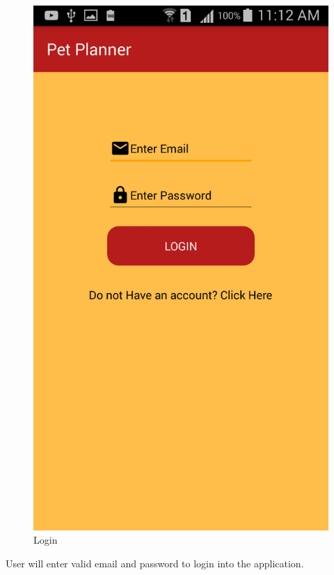 \begin{figure}[H]  
  \centering
    \includegraphics[scale=0.3]{81login}
    \caption{Login}
\end{figure}

User will enter valid email and password to login into the application.

\newpage
